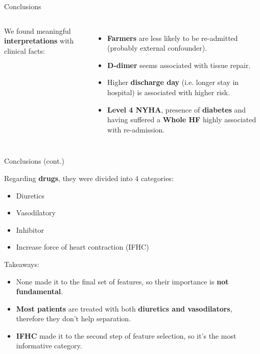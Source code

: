 \documentclass[aspectratio=169,xcolor=dvipsnames]{beamer}
\begin{document}
\begin{frame}{Conclusions}
\begin{columns}[c]
        We found meaningful \textbf{interpretations} with clinical facts:
        \begin{itemize}
            \item \textbf{Farmers} are less likely to be re-admitted (probably external confounder).
            \item \textbf{D-dimer} seems associated with tissue repair.
            \item Higher \textbf{discharge day} (i.e. longer stay in hospital) is associated with higher risk.
            \item \textbf{Level 4 NYHA}, presence of \textbf{diabetes} and having suffered a \textbf{Whole HF} highly associated with re-admission.
        \end{itemize}
    \end{columns}
    
\end{frame}

\begin{frame}{Conclusions (cont.)}

    Regarding \textbf{drugs}, they were divided into 4 categories:
    \begin{itemize}
        \item Diuretics
        \item Vasodilatory
        \item Inhibitor
        \item Increase force of heart contraction (IFHC)
    \end{itemize}
    \pause
    Takeaways:
    \begin{itemize}
        \item None made it to the final set of features, so their importance is \textbf{not fundamental}.
        \pause
        \item \textbf{Most patients} are treated with both \textbf{diuretics and vasodilators}, therefore they don't help separation.
        \pause
        \item \textbf{IFHC} made it to the second step of feature selection, so it's the most informative category.
    \end{itemize}

\end{frame}
\end{document}
